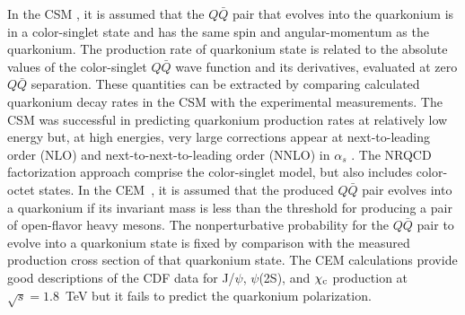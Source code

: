 \documentclass[aps,prc,preprint,superscriptaddress,showpacs,showkeys,amsmath]{revtex4-1}
\begin{document}
  In the CSM \cite{Einhorn:1975ua,Ellis:1976fj,Carlson:1976cd,Berger:1980ni},
it is assumed that the $Q\bar Q$ pair that evolves into
the quarkonium is in a color-singlet state and has the same spin
and angular-momentum as the quarkonium. 
 The production rate of quarkonium state is related to 
the absolute values of the color-singlet $Q\bar Q$ wave function and 
its derivatives, evaluated at zero $Q\bar Q$ separation. These quantities 
can be extracted by comparing calculated quarkonium decay
rates in the CSM with the experimental measurements. 
 The CSM was successful in predicting quarkonium production rates at
relatively low energy \cite{Schuler:1994hy} but, at high
energies, very large corrections appear at next-to-leading
order (NLO) and next-to-next-to-leading order (NNLO) in $\alpha_s$
\cite{Artoisenet:2007xi,Campbell:2007ws,Artoisenet:2008fc}.
  The NRQCD factorization approach comprise the color-singlet model, 
but also includes color-octet states.
    In the CEM~\cite{Fritzsch:1977ay,Amundson:1995em,Amundson:1996qr}, it
is assumed that the produced $Q\bar Q$ pair evolves into a quarkonium
if its invariant mass is less than the threshold for producing a 
pair of open-flavor heavy mesons. 
 The nonperturbative probability for the $Q\bar Q$ pair to evolve into 
a quarkonium state is fixed by comparison with the measured production
cross section of that quarkonium state.
 The CEM calculations provide good descriptions of the CDF data for J/$\psi$,
$\psi$(2S), and $\chi_{\rm c}$ production at $\sqrt{s}=1.8$~TeV
\cite{Amundson:1996qr} but it fails to predict the quarkonium 
polarization.
\end{document}
